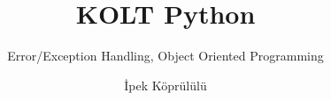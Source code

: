
\usepackage{../KU-Beamer-Template/style/koc} 
\usepackage{minted}
\usepackage{upquote}
\usepackage{graphicx}
\usepackage{tikz}
\usetikzlibrary{shapes.symbols,positioning, chains}

\title{KOLT Python}
\subtitle{Error/Exception Handling, Object Oriented Programming} 
\date{}
\author{İpek Köprülülü}

\makeatletter
\let\@@magyar@captionfix\relax
\makeatother
{} %


    \maketitle

    
